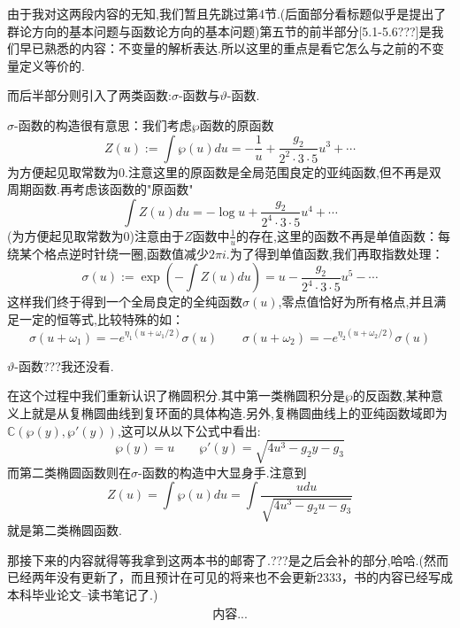 \documentclass[12pt,A4paper,oneside]{amsart}
\numberwithin{equation}{section}
\theoremstyle{plain}
\theoremstyle{plain}
\theoremstyle{plain}
\numberwithin{equation}{section}
\theoremstyle{remark}
\begin{document}
由于我对这两段内容的无知,我们暂且先跳过第4节.(后面部分看标题似乎是提出了群论方向的基本问题与函数论方向的基本问题)第五节的前半部分[5.1-5.6???]是我们早已熟悉的内容：不变量的解析表达.所以这里的重点是看它怎么与之前的不变量定义等价的.

而后半部分则引入了两类函数:$\sigma$-函数与$\vartheta$-函数.

$\sigma$-函数的构造很有意思：我们考虑$\wp$函数的原函数
$$Z(u):=\int \wp(u)du=-\frac{1}{u}+\frac{g_2}{2^2 \cdot 3 \cdot 5}u^3+\cdots$$
为方便起见取常数为0.注意这里的原函数是全局范围良定的亚纯函数,但不再是双周期函数.再考虑该函数的"原函数"
$$\int Z(u)du=- \log u+\frac{g_2}{2^4 \cdot 3 \cdot 5}u^4+\cdots$$
(为方便起见取常数为0)注意由于$Z$函数中$\frac{1}{u}$的存在,这里的函数不再是单值函数：每绕某个格点逆时针绕一圈,函数值减少$2\pi i$.为了得到单值函数,我们再取指数处理：
$$\sigma(u):=\exp\left(-\int Z(u)du\right)=u-\frac{g_2}{2^4 \cdot 3 \cdot 5}u^5-\cdots$$
这样我们终于得到一个全局良定的全纯函数$\sigma(u)$,零点值恰好为所有格点,并且满足一定的恒等式,比较特殊的如：
$$\sigma (u+\omega_1)=-e^{\eta_1(u+\omega_1/2)}\sigma(u) \qquad \sigma (u+\omega_2)=-e^{\eta_2(u+\omega_2/2)}\sigma(u)$$

$\vartheta$-函数???我还没看.

在这个过程中我们重新认识了椭圆积分.其中第一类椭圆积分是$\wp$的反函数,某种意义上就是从复椭圆曲线到复环面的具体构造.另外,复椭圆曲线上的亚纯函数域即为$\mathbb{C}(\wp(y),\wp'(y))$,这可以从以下公式中看出:
$$\wp(y)=u \qquad \wp'(y)=\sqrt{4u^3-g_2y-g_3}$$
而第二类椭圆函数则在$\sigma$-函数的构造中大显身手.注意到
$$Z(u)=\int \wp(u)du=\int \frac{udu}{\sqrt{4u^3-g_2u-g_3}}$$
就是第二类椭圆函数.

那接下来的内容就得等我拿到这两本书的邮寄了.???是之后会补的部分,哈哈.(然而已经两年没有更新了，而且预计在可见的将来也不会更新2333，书\cite{klein2003lectures}的内容已经写成本科毕业论文--读书笔记了.)
\begin{equation*}
\begin{aligned}
内容...
\end{aligned}
\end{equation*}






	





\end{document}

